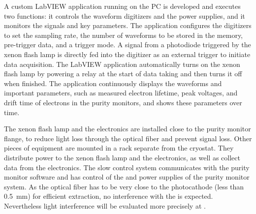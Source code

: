 A custom LabVIEW application running on the  PC is developed and %
executes two functions: it controls the waveform digitizers and the power supplies, and it monitors the signals and key parameters. The application configures the digitizers to set the sampling rate, the number of waveforms to be stored in the memory, pre-trigger data, and a trigger mode. A signal from a photodiode triggered by the xenon flash lamp is directly fed into the digitizer as an external trigger to initiate data acquisition. The LabVIEW application automatically turns on the xenon flash lamp by powering a relay at the start of data taking and then turns it off when finished.
The application continuously displays the waveforms and important parameters, such as measured electron lifetime, peak voltages, and drift time of electrons in the purity monitors, and shows these parameters over time.

The xenon flash lamp and the  electronics are installed close to the purity monitor flange, to reduce light loss through the optical fiber and prevent signal loss. Other pieces of equipment are mounted in a rack separate from the cryostat. They distribute power to the xenon flash lamp and the  electronics, as well as collect data from the electronics. The slow control system communicates with the purity monitor  software and has control of the  and  power supplies of the purity monitor system. As the optical fiber has to be very close to the photocathode (less than \SI{0.5}{\milli\meter}) for efficient \phel extraction, no interference with the  is expected. Nevertheless light interference will be evaluated more precisely at .

